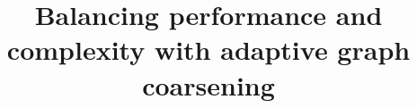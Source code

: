 \title{Balancing performance and complexity with adaptive graph coarsening}


\author{}

\institute{}

\maketitle
